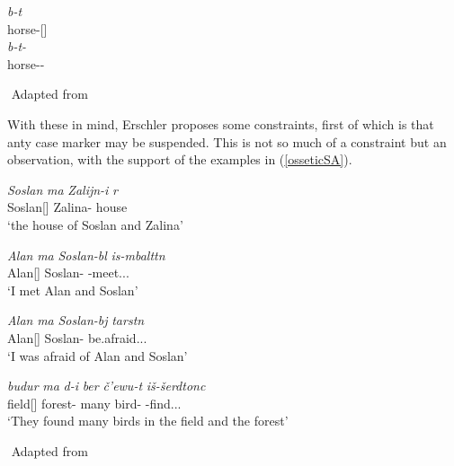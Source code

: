 \begin{exe}
    \ex \label{osseticdeletion}
    \begin{xlist}
        \ex \gll
        \textit{b\textturna\textchi-t\textturna} \\ horse-{\Pl}[{\Nom}] \\
        
        \ex \gll 
        \textit{b\textturna\textchi-t-\textschwa} \\ horse-{\Pl}-{\Obl} \\
    \end{xlist}
    ${}$ \hfill Adapted from \cite{erschler2012suspended}
\end{exe}

With these in mind, Erschler proposes some constraints, first of which is that anty case marker may be suspended. This is not so much of a constraint but an observation, with the support of the examples in (\ref{osseticSA}).

\begin{exe}
    \ex \label{osseticSA}
    \begin{xlist}
        \ex \gll 
        \textit{Soslan} \textit{\textturna ma} \textit{Zalijn-i} \textit{\textchi\textturna\textdzlig r\textturna} \\ Soslan[{\Nom}] {\And} Zalina-{\Obl} house \\
        \glt `the house of Soslan and Zalina'
        
        \ex \gll 
        \textit{Alan} \textit{\textturna ma} \textit{Soslan-b\textturna l} \textit{is-\textturna mbaltt\textturna n} \\ Alan[{\Nom}] {\And} Soslan-{\Sup} {\Prv}-meet.{\Pst}.{\First}.{\Sg} \\
        \glt `I met Alan and Soslan'
        
        \ex \gll 
        \textit{Alan} \textit{\textturna ma} \textit{Soslan-b\textturna j} \textit{tarst\textturna n} \\ Alan[{\Nom}] {\And} Soslan-{\Abl} be.afraid.{\Pst}.{\First}.{\Sg} \\
        \glt `I was afraid of Alan and Soslan'
        
        \ex \gll 
        \textit{budur} \textit{\textturna ma} \textit{\textinvscr\textturna d-i} \textit{ber\textturna} \textit{\v{c}'ewu-t\textturna} \textit{i\v{s}-\v{s}erdtonc\textturna} \\ field[{\Nom}] {\And} forest-{\Loc} many bird-{\Pl} {\Prv}-find.{\Pst}.{\Third}.{\Pl} \\
        \glt `They found many birds in the field and the forest'
    \end{xlist}
    ${}$ \hfill Adapted from \cite{erschler2012suspended}
\end{exe}

